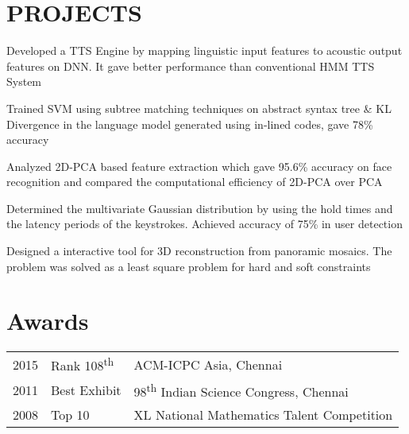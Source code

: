 \documentclass[]{deedy-resume-openfont}
\begin{document}
\begin{minipage}[t]{0.66\textwidth}

\section{PROJECTS}
\descript{}
Developed a TTS Engine by mapping linguistic input features to acoustic output features on DNN. It gave better performance than conventional HMM TTS System
\sectionsep

\descript{}
Trained SVM using subtree matching techniques on abstract syntax tree \& KL Divergence in the language model generated using in-lined codes, gave 78\% accuracy
\sectionsep

\descript{}
Analyzed 2D-PCA based feature extraction which gave 95.6\% accuracy on face recognition and compared the computational efficiency of 2D-PCA over PCA
\sectionsep

\descript{}
Determined the multivariate Gaussian distribution by using the hold times and the latency periods of the keystrokes. Achieved accuracy of 75\% in user detection
\sectionsep

\descript{}
Designed a interactive tool for 3D reconstruction from panoramic mosaics. The problem was solved as a least square problem for hard and soft constraints
\sectionsep


\section{Awards} 
\begin{tabular}{rll}
2015	     & Rank 108\textsuperscript{th}  & ACM-ICPC Asia, Chennai\\
2011	     & Best Exhibit  & 98\textsuperscript{th} Indian Science Congress, Chennai\\
2008     & Top 10 & XL National Mathematics Talent Competition  \\
\end{tabular}
\sectionsep


\end{minipage} 
\end{document}
